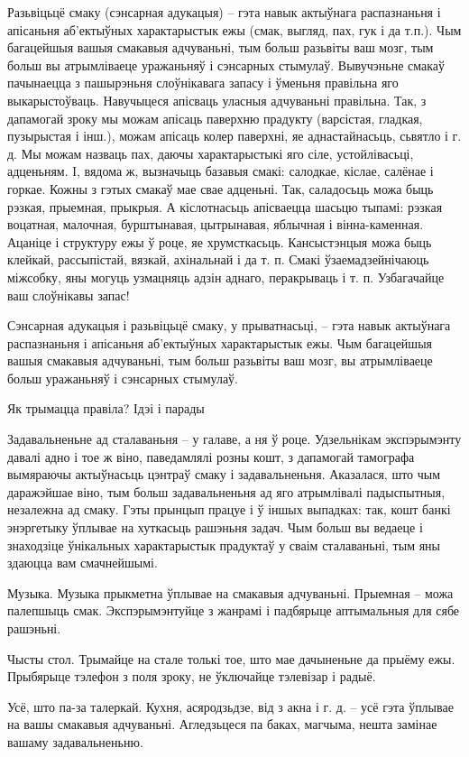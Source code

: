 Разьвіцьцё смаку (сэнсарная адукацыя) – гэта навык актыўнага распазнаньня і апісаньня аб'ектыўных характарыстык ежы (смак, выгляд, пах, гук і да т.п.).
Чым багацейшыя вашыя смакавыя адчуваньні, тым больш разьвіты ваш мозг, тым больш вы атрымліваеце уражаньняў і сэнсарных стымулаў. Вывучэньне смакаў пачынаецца з пашырэньня слоўнікавага запасу і ўменьня правільна яго выкарыстоўваць. Навучыцеся апісваць уласныя адчуваньні правільна. Так, з дапамогай зроку мы можам апісаць паверхню прадукту (варсістая, гладкая, пузырыстая і інш.), можам апісаць колер паверхні, яе аднастайнасьць, сьвятло і г. д. Мы можам назваць пах, даючы характарыстыкі яго сіле, устойлівасьці, адценьням. І, вядома ж, вызначыць базавыя смакі: салодкае, кіслае, салёнае і горкае. Кожны з гэтых смакаў мае свае адценьні. Так, саладосьць можа быць рэзкая, прыемная, прыкрыя. А кіслотнасьць апісваецца шасьцю тыпамі: рэзкая воцатная, малочная, бурштынавая, цытрынавая, яблычная і вінна-каменная. Ацаніце і структуру ежы ў роце, яе хрумсткасьць. Кансыстэнцыя можа быць клейкай, рассыпістай, вязкай, ахінальнай і да т. п. Смакі ўзаемадзейнічаюць міжсобку, яны могуць узмацняць адзін аднаго, перакрываць і т. п. Узбагачайце ваш слоўнікавы запас!

Сэнсарная адукацыя і разьвіцьцё смаку, у прыватнасьці, – гэта навык актыўнага распазнаньня і апісаньня аб'ектыўных характарыстык ежы. Чым багацейшыя вашыя смакавыя адчуваньні, тым больш разьвіты ваш мозг, вы атрымліваеце больш уражаньняў і сэнсарных стымулаў.

Як трымацца правіла? Ідэі і парады

Задавальненьне ад сталаваньня – у галаве, а ня ў роце.
Удзельнікам экспэрымэнту давалі адно і тое ж віно, паведамлялі розны кошт, з дапамогай тамографа вымяраючы актыўнасьць цэнтраў смаку і задавальненьня. Аказалася, што чым даражэйшае віно, тым больш задавальненьня ад яго атрымлівалі падыспытныя, незалежна ад смаку. Гэты прынцып працуе і ў іншых выпадках: так, кошт банкі энэргетыку ўплывае на хуткасьць рашэньня задач. Чым больш вы ведаеце і знаходзіце ўнікальных характарыстык прадуктаў у сваім сталаваньні, тым яны здаюцца вам смачнейшымі.

Музыка.
Музыка прыкметна ўплывае на смакавыя адчуваньні. Прыемная – можа палепшыць смак. Экспэрымэнтуйце з жанрамі і падбярыце аптымальныя для сябе рашэньні.

Чысты стол.
Трымайце на стале толькі тое, што мае дачыненьне да прыёму ежы. Прыбярыце тэлефон з поля зроку, не ўключайце тэлевізар і радыё.

Усё, што па-за талеркай.
Кухня, асяродзьдзе, від з акна і г. д. – усё гэта ўплывае на вашы смакавыя адчуваньні. Агледзьцеся па баках, магчыма, нешта замінае вашаму задавальненьню.

